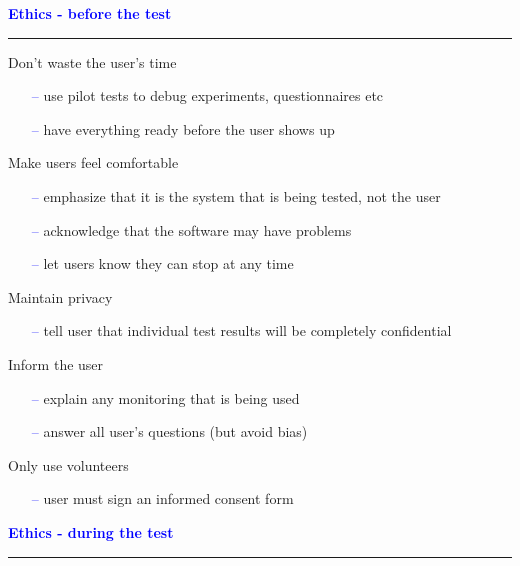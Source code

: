 \documentclass[pdf]{beamer}
\begin{document}
{{{{{{{{{{{{{{%
{
\begin{frame}
	\vspace{8mm}
	\textcolor{Blue}{\textbf{\large{Ethics - before the test}}}
    \textcolor{red}{\rule{10cm}{1mm}}
    
    {\Large Don’t waste the user’s time}
	\begin{itemize}
    	\item[\textcolor{Blue}{--}]use pilot tests to debug experiments, questionnaires etc
    	\item[\textcolor{Blue}{--}]have everything ready before the user shows up
	\end{itemize}
    {\Large Make users feel comfortable}
    \begin{itemize}
    	\item[\textcolor{Blue}{--}]emphasize that it is the system that is being tested, not the user
    	\item[\textcolor{Blue}{--}]acknowledge that the software may have problems
    	\item[\textcolor{Blue}{--}]let users know they can stop at any time
	\end{itemize}
    {\Large Maintain privacy}
    \begin{itemize}
    	\item[\textcolor{Blue}{--}]tell user that individual test results will be completely confidential
	\end{itemize}
    {\Large Inform the user}
    \begin{itemize}
    	\item[\textcolor{Blue}{--}]explain any monitoring that is being used
    	\item[\textcolor{Blue}{--}]answer all user’s questions (but avoid bias)
	\end{itemize}
    {\Large Only use volunteers}
    \begin{itemize}
    	\item[\textcolor{Blue}{--}]user must sign an informed consent form
    \end{itemize}
\end{frame}



{
\begin{frame}
	\vspace{8mm}
	\textcolor{Blue}{\textbf{\large{Ethics - during the test}}}
    \textcolor{red}{\rule{10cm}{1mm}}
    

\end{frame}}}}}}}}}}}}}}}}}
\end{document}
